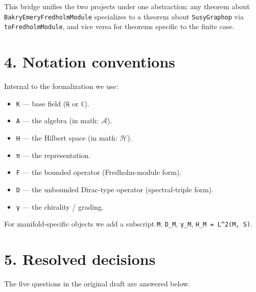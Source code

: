 \documentclass[
  11pt,
]{article}
\providecommand{\tightlist}{%
  \setlength{\itemsep}{0pt}\setlength{\parskip}{0pt}}
\begin{document}
This bridge unifies the two projects under one abstraction: any theorem
about \texttt{BakryEmeryFredholmModule} specializes to a theorem about
\texttt{SusyGraphop} via \texttt{toFredholmModule}, and vice versa for
theorems specific to the finite case.

\section{4. Notation conventions}\label{notation-conventions}

Internal to the formalization we use:

\begin{itemize}
\tightlist
\item
  \texttt{K} --- base field (\texttt{ℝ} or \texttt{ℂ}).
\item
  \texttt{A} --- the algebra (in math: \(\mathcal{A}\)).
\item
  \texttt{H} --- the Hilbert space (in math: \(\mathcal{H}\)).
\item
  \texttt{π} --- the representation.
\item
  \texttt{F} --- the bounded operator (Fredholm-module form).
\item
  \texttt{D} --- the unbounded Dirac-type operator (spectral-triple
  form).
\item
  \texttt{γ} --- the chirality / grading.
\end{itemize}

For manifold-specific objects we add a subscript \texttt{M}:
\texttt{D\_M}, \texttt{γ\_M}, \texttt{H\_M\ =\ L\^{}2(M,\ S)}.

\section{5. Resolved decisions}\label{resolved-decisions}

The five questions in the original draft are answered below.
\end{document}
